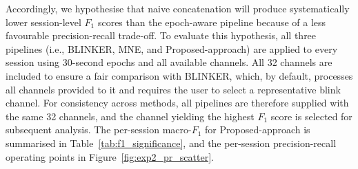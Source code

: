 Accordingly, we hypothesise that naive concatenation will produce systematically lower session-level $F_1$ scores than the epoch-aware pipeline because of a less favourable precision-recall trade-off. To evaluate this hypothesis, all three pipelines (i.e., BLINKER, MNE, and Proposed-approach) are applied to every session using 30-second epochs and all available channels. All 32 channels are included to ensure a fair comparison with BLINKER, which, by default, processes all channels provided to it and requires the user to select a representative blink channel. For consistency across methods, all pipelines are therefore supplied with the same 32 channels, and the channel yielding the highest $F_1$ score is selected for subsequent analysis. The per-session macro-$F_1$ for Proposed-approach is summarised in Table~\ref{tab:f1_significance}, and the per-session precision-recall operating points in Figure~\ref{fig:exp2_pr_scatter}.
